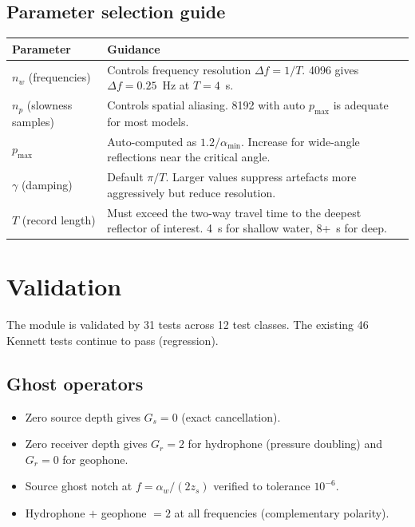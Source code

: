 \documentclass[11pt,a4paper]{article}
\newcommand{\D}{\Delta}
\begin{document}
\subsection{Parameter selection guide}

\begin{center}
\renewcommand{\arraystretch}{1.3}
\begin{tabular}{lp{9cm}}
\toprule
\textbf{Parameter} & \textbf{Guidance} \\
\midrule
$n_w$ (frequencies) &
  Controls frequency resolution $\D f = 1/T$.
  4096 gives $\D f = 0.25$~Hz at $T = 4$~s. \\
$n_p$ (slowness samples) &
  Controls spatial aliasing.  8192 with auto $p_{\max}$ is
  adequate for most models. \\
$p_{\max}$ &
  Auto-computed as $1.2 / \alpha_{\min}$.  Increase for
  wide-angle reflections near the critical angle. \\
$\gamma$ (damping) &
  Default $\pi / T$.  Larger values suppress artefacts
  more aggressively but reduce resolution. \\
$T$ (record length) &
  Must exceed the two-way travel time to the deepest
  reflector of interest.  4~s for shallow water, 8+~s for deep. \\
\bottomrule
\end{tabular}
\end{center}

\section{Validation}
\label{sec:validation}

The module is validated by 31 tests across 12 test classes.
The existing 46 Kennett tests continue to pass (regression).

\subsection{Ghost operators}

\begin{itemize}[nosep]
  \item Zero source depth gives $G_s = 0$ (exact cancellation).
  \item Zero receiver depth gives $G_r = 2$ for hydrophone
    (pressure doubling) and $G_r = 0$ for geophone.
  \item Source ghost notch at $f = \alpha_w / (2z_s)$ verified
    to tolerance $10^{-6}$.
  \item Hydrophone $+$ geophone $= 2$ at all frequencies
    (complementary polarity).
\end{itemize}
\end{document}
